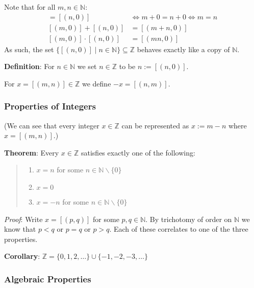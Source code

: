 \documentclass[11pt]{article}
\begin{document}
Note that for all $m,n \in \mathbb{N}$:
\begin{align*}
[(m,0)] = [(n,0)] &\iff m+0 = n+0 \iff m = n\\
[(m,0)] + [(n,0)] &= [(m+n, 0)]\\
[(m,0)] \cdot [(n,0)] &= [(mn, 0)]
\end{align*}
As such, the set $\{[(n,0)] \;|\; n \in \mathbb{N}\} \subseteq \mathbb{Z}$ behaves exactly like a copy of $\mathbb{N}$.

\textbf{Definition}: For $n \in \mathbb{N}$ we set $n \in \mathbb{Z}$ to be $n := [(n,0)]$.

\hspace{2cm}For $x = [(m,n)] \in \mathbb{Z}$ we define $-x = [(n,m)]$.

\subsubsection{Properties of Integers}

(We can see that every integer $x \in \mathbb{Z}$ can be represented as $x := m - n$ where $x = [(m,n)]$.)

\textbf{Theorem}: Every $x \in \mathbb{Z}$ satisfies exactly one of the following:
\begin{quote}\vspace{-0.3cm}
	\begin{enumerate}
	\item $x = n$ for some $n \in \mathbb{N} \backslash \{0\}$
	\item $x = 0$
	\item $x = -n$ for some $n \in \mathbb{N} \backslash \{0\}$
	\end{enumerate}
\end{quote}
\emph{Proof}: Write $x = [(p,q)]$ for some $p,q \in \mathbb{N}$. By trichotomy of order on $\mathbb{N}$ we know that $p < q$ or $p = q$ or $p > q$. Each of these correlates to one of the three properties.

\textbf{Corollary}: $\mathbb{Z} = \{0,1,2, \ldots \} \cup \{-1, -2, -3, \ldots \}$

\subsubsection{Algebraic Properties}
\end{document}
